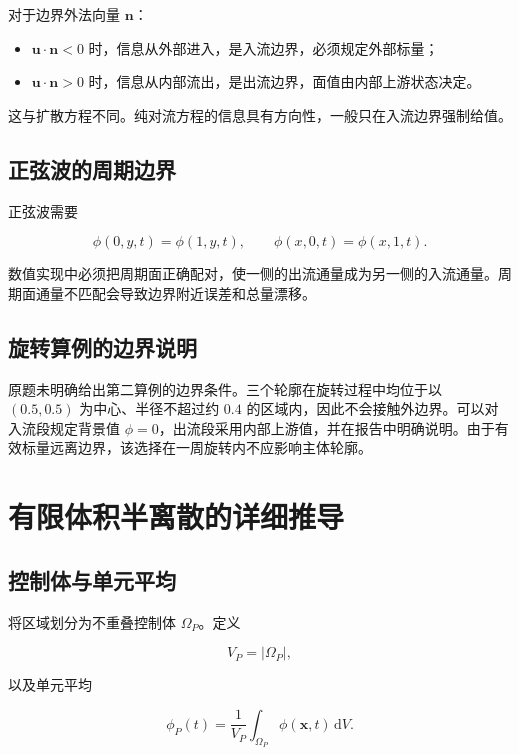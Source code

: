 \documentclass[UTF8,12pt,a4paper,fontset=fandol]{ctexart}
\numberwithin{equation}{section}
\newcommand{\dd}{\,\mathrm d}
\newcommand{\xf}{\bm x}
\begin{document}
对于边界外法向量 $\bm n$：

\begin{itemize}
  \item $\bm u\cdot\bm n<0$ 时，信息从外部进入，是入流边界，必须规定外部标量；
  \item $\bm u\cdot\bm n>0$ 时，信息从内部流出，是出流边界，面值由内部上游状态决定。
\end{itemize}

这与扩散方程不同。纯对流方程的信息具有方向性，一般只在入流边界强制给值。

\subsection{正弦波的周期边界}

正弦波需要

\begin{equation}
  \phi(0,y,t)=\phi(1,y,t),
  \qquad
  \phi(x,0,t)=\phi(x,1,t).
\end{equation}

数值实现中必须把周期面正确配对，使一侧的出流通量成为另一侧的入流通量。周期面通量不匹配会导致边界附近误差和总量漂移。

\subsection{旋转算例的边界说明}

原题未明确给出第二算例的边界条件。三个轮廓在旋转过程中均位于以 $(0.5,0.5)$ 为中心、半径不超过约 $0.4$ 的区域内，因此不会接触外边界。可以对入流段规定背景值 $\phi=0$，出流段采用内部上游值，并在报告中明确说明。由于有效标量远离边界，该选择在一周旋转内不应影响主体轮廓。

\section{有限体积半离散的详细推导}

\subsection{控制体与单元平均}

将区域划分为不重叠控制体 $\Omega_P$。定义

\begin{equation}
  V_P=|\Omega_P|,
\end{equation}

以及单元平均

\begin{equation}
  \phi_P(t)
  =
  \frac1{V_P}
  \int_{\Omega_P}\phi(\xf,t)\dd V.
  \label{eq:cell_average}
\end{equation}
\end{document}
